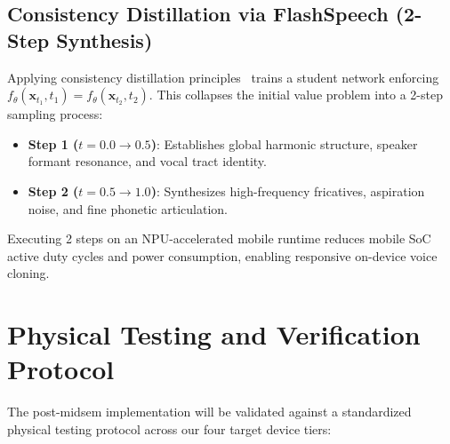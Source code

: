 \subsection{Consistency Distillation via FlashSpeech (2-Step Synthesis)}
Applying consistency distillation principles~\cite{flashspeech2024} trains a student network enforcing $f_\theta(\mathbf{x}_{t_1}, t_1) = f_\theta(\mathbf{x}_{t_2}, t_2)$. This collapses the initial value problem into a 2-step sampling process:
\begin{itemize}
    \item \textbf{Step 1 ($t = 0.0 \to 0.5$)}: Establishes global harmonic structure, speaker formant resonance, and vocal tract identity.
    \item \textbf{Step 2 ($t = 0.5 \to 1.0$)}: Synthesizes high-frequency fricatives, aspiration noise, and fine phonetic articulation.
\end{itemize}
Executing 2 steps on an NPU-accelerated mobile runtime reduces mobile SoC active duty cycles and power consumption, enabling responsive on-device voice cloning.

\section{Physical Testing and Verification Protocol}
The post-midsem implementation will be validated against a standardized physical testing protocol across our four target device tiers:

